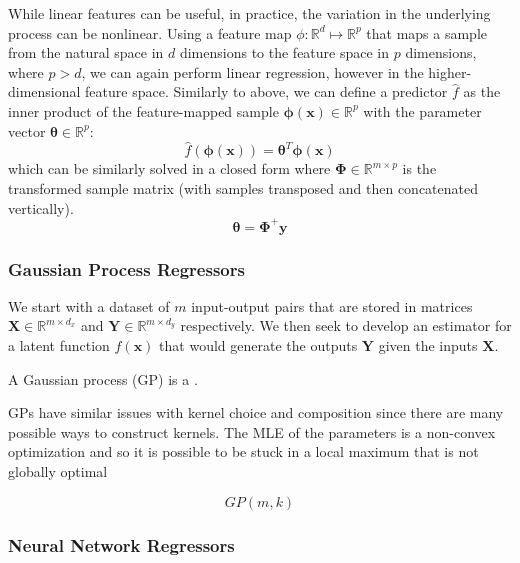 \documentclass[conference]{IEEEtran}
\begin{document}
	While linear features can be useful, in practice, the variation in the underlying process can be nonlinear. Using a feature map $\phi: \mathbb{R}^d \mapsto \mathbb{R}^p$ that maps a sample from the natural space in $d$ dimensions to the feature space in $p$ dimensions, where $p > d$, we can again perform linear regression, however in the higher-dimensional feature space. Similarly to above, we can define a predictor $\hat f$ as the inner product of the feature-mapped sample $\boldsymbol{\phi(x)} \in \mathbb{R}^p$ with the parameter vector $\boldsymbol{\theta} \in \mathbb{R}^p$:
    \begin{equation}
        \hat f(\boldsymbol{\phi(x)}) = \boldsymbol{\theta}^T \boldsymbol{\phi(x)}
    \end{equation}
    which can be similarly solved in a closed form where $\boldsymbol \Phi \in \mathbb{R}^{m \times p}$ is the transformed sample matrix (with samples transposed and then concatenated vertically).
    \begin{equation}
	    \boldsymbol{\theta} = \boldsymbol{\Phi}^+ \boldsymbol{y}
	\end{equation}
	
	\subsubsection{Gaussian Process Regressors}
	
	
	We start with a dataset of $m$ input-output pairs that are stored in matrices $\mathbf{X} \in \mathbb{R}^{m \times d_x}$ and $\mathbf{Y} \in \mathbb{R}^{m \times d_y}$ respectively. We then seek to develop an estimator for a latent function $f(\mathbf{x})$ that would generate the outputs $\mathbf{Y}$ given the inputs $\mathbf{X}$.
	
	A Gaussian process (GP) is a \cite{williams2006gaussian}.
	
	GPs have similar issues with kernel choice and composition since there are many possible ways to construct kernels. The MLE of the parameters is a non-convex optimization and so it is possible to be stuck in a local maximum that is not globally optimal
	
	\begin{equation*}
	GP(m, k)
	\end{equation*}
	
	\subsubsection{Neural Network Regressors}
	
\end{document}
